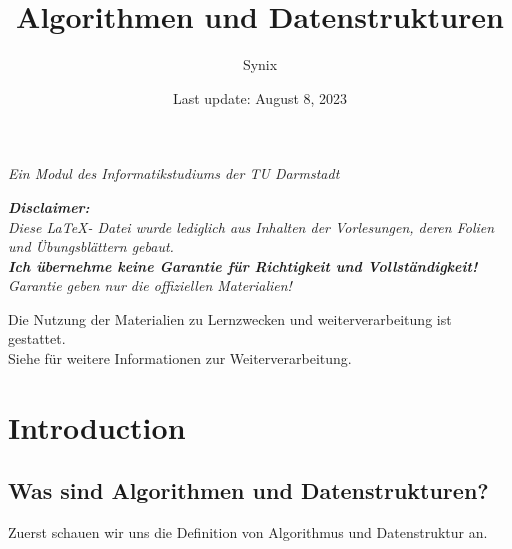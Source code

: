 \documentclass{article}
\title{Algorithmen und Datenstrukturen}
\author{Synix}
\date{Last update: August 8, 2023}
\begin{document}
    \maketitle

    \begin{center}
        \textit{Ein Modul des Informatikstudiums der TU Darmstadt}
    \end{center}

    \newpage

    \begin{center}
        \textit{ \textbf{Disclaimer:}\\
            Diese \LaTeX{}- Datei wurde lediglich aus Inhalten der Vorlesungen, deren Folien und Übungsblättern gebaut. \\
            \textbf{Ich übernehme keine Garantie für Richtigkeit und Vollständigkeit!} \\
            Garantie geben nur die offiziellen Materialien!}\\

            \vspace{0.5cm}

            Die Nutzung der Materialien zu Lernzwecken und weiterverarbeitung ist gestattet. \\
            \vspace{0.5cm}
            Siehe  für weitere Informationen zur Weiterverarbeitung.
    \end{center}

    \newpage

    \tableofcontents

    \newpage

    \section{Introduction}
        \subsection{Was sind Algorithmen und Datenstrukturen?}
            Zuerst schauen wir uns die Definition von Algorithmus und Datenstruktur an. \\   
\end{document}
